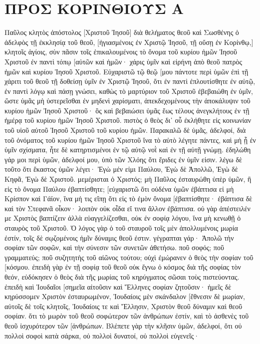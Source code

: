 \section{ΠΡΟΣ ΚΟΡΙΝΘΙΟΥΣ Α}
Παῦλος κλητὸς ἀπόστολος [Χριστοῦ Ἰησοῦ] διὰ θελήματος θεοῦ καὶ Σωσθένης ὁ ἀδελφὸς 
τῇ ἐκκλησίᾳ τοῦ θεοῦ, [ἡγιασμένοις ἐν Χριστῷ Ἰησοῦ, τῇ οὔσῃ ἐν Κορίνθῳ,] κλητοῖς ἁγίοις, σὺν πᾶσιν τοῖς ἐπικαλουμένοις τὸ ὄνομα τοῦ κυρίου ἡμῶν Ἰησοῦ Χριστοῦ ἐν παντὶ τόπῳ [αὐτῶν καὶ ἡμῶν· 
χάρις ὑμῖν καὶ εἰρήνη ἀπὸ θεοῦ πατρὸς ἡμῶν καὶ κυρίου Ἰησοῦ Χριστοῦ. 
Εὐχαριστῶ τῷ θεῷ [μου πάντοτε περὶ ὑμῶν ἐπὶ τῇ χάριτι τοῦ θεοῦ τῇ δοθείσῃ ὑμῖν ἐν Χριστῷ Ἰησοῦ, 
ὅτι ἐν παντὶ ἐπλουτίσθητε ἐν αὐτῷ, ἐν παντὶ λόγῳ καὶ πάσῃ γνώσει, 
καθὼς τὸ μαρτύριον τοῦ Χριστοῦ ἐβεβαιώθη ἐν ὑμῖν, 
ὥστε ὑμᾶς μὴ ὑστερεῖσθαι ἐν μηδενὶ χαρίσματι, ἀπεκδεχομένους τὴν ἀποκάλυψιν τοῦ κυρίου ἡμῶν Ἰησοῦ Χριστοῦ· 
ὃς καὶ βεβαιώσει ὑμᾶς ἕως τέλους ἀνεγκλήτους ἐν τῇ ἡμέρᾳ τοῦ κυρίου ἡμῶν Ἰησοῦ Χριστοῦ. 
πιστὸς ὁ θεὸς δι᾽ οὗ ἐκλήθητε εἰς κοινωνίαν τοῦ υἱοῦ αὐτοῦ Ἰησοῦ Χριστοῦ τοῦ κυρίου ἡμῶν. 
Παρακαλῶ δὲ ὑμᾶς, ἀδελφοί, διὰ τοῦ ὀνόματος τοῦ κυρίου ἡμῶν Ἰησοῦ Χριστοῦ ἵνα τὸ αὐτὸ λέγητε πάντες, καὶ μὴ ᾖ ἐν ὑμῖν σχίσματα, ἦτε δὲ κατηρτισμένοι ἐν τῷ αὐτῷ νοῒ καὶ ἐν τῇ αὐτῇ γνώμῃ. 
ἐδηλώθη γάρ μοι περὶ ὑμῶν, ἀδελφοί μου, ὑπὸ τῶν Χλόης ὅτι ἔριδες ἐν ὑμῖν εἰσιν. 
λέγω δὲ τοῦτο ὅτι ἕκαστος ὑμῶν λέγει· Ἐγὼ μέν εἰμι Παύλου, Ἐγὼ δὲ Ἀπολλῶ, Ἐγὼ δὲ Κηφᾶ, Ἐγὼ δὲ Χριστοῦ. 
μεμέρισται ὁ Χριστός; μὴ Παῦλος ἐσταυρώθη ὑπὲρ ὑμῶν, ἢ εἰς τὸ ὄνομα Παύλου ἐβαπτίσθητε; 
[εὐχαριστῶ ὅτι οὐδένα ὑμῶν ἐβάπτισα εἰ μὴ Κρίσπον καὶ Γάϊον, 
ἵνα μή τις εἴπῃ ὅτι εἰς τὸ ἐμὸν ὄνομα [ἐβαπτίσθητε· 
ἐβάπτισα δὲ καὶ τὸν Στεφανᾶ οἶκον· λοιπὸν οὐκ οἶδα εἴ τινα ἄλλον ἐβάπτισα. 
οὐ γὰρ ἀπέστειλέν με Χριστὸς βαπτίζειν ἀλλὰ εὐαγγελίζεσθαι, οὐκ ἐν σοφίᾳ λόγου, ἵνα μὴ κενωθῇ ὁ σταυρὸς τοῦ Χριστοῦ. 
Ὁ λόγος γὰρ ὁ τοῦ σταυροῦ τοῖς μὲν ἀπολλυμένοις μωρία ἐστίν, τοῖς δὲ σῳζομένοις ἡμῖν δύναμις θεοῦ ἐστιν. 
γέγραπται γάρ· Ἀπολῶ τὴν σοφίαν τῶν σοφῶν, καὶ τὴν σύνεσιν τῶν συνετῶν ἀθετήσω. 
ποῦ σοφός; ποῦ γραμματεύς; ποῦ συζητητὴς τοῦ αἰῶνος τούτου; οὐχὶ ἐμώρανεν ὁ θεὸς τὴν σοφίαν τοῦ [κόσμου. 
ἐπειδὴ γὰρ ἐν τῇ σοφίᾳ τοῦ θεοῦ οὐκ ἔγνω ὁ κόσμος διὰ τῆς σοφίας τὸν θεόν, εὐδόκησεν ὁ θεὸς διὰ τῆς μωρίας τοῦ κηρύγματος σῶσαι τοὺς πιστεύοντας. 
ἐπειδὴ καὶ Ἰουδαῖοι [σημεῖα αἰτοῦσιν καὶ Ἕλληνες σοφίαν ζητοῦσιν· 
ἡμεῖς δὲ κηρύσσομεν Χριστὸν ἐσταυρωμένον, Ἰουδαίοις μὲν σκάνδαλον [ἔθνεσιν δὲ μωρίαν, 
αὐτοῖς δὲ τοῖς κλητοῖς, Ἰουδαίοις τε καὶ Ἕλλησιν, Χριστὸν θεοῦ δύναμιν καὶ θεοῦ σοφίαν. 
ὅτι τὸ μωρὸν τοῦ θεοῦ σοφώτερον τῶν ἀνθρώπων ἐστίν, καὶ τὸ ἀσθενὲς τοῦ θεοῦ ἰσχυρότερον τῶν [ἀνθρώπων. 
Βλέπετε γὰρ τὴν κλῆσιν ὑμῶν, ἀδελφοί, ὅτι οὐ πολλοὶ σοφοὶ κατὰ σάρκα, οὐ πολλοὶ δυνατοί, οὐ πολλοὶ εὐγενεῖς· 
